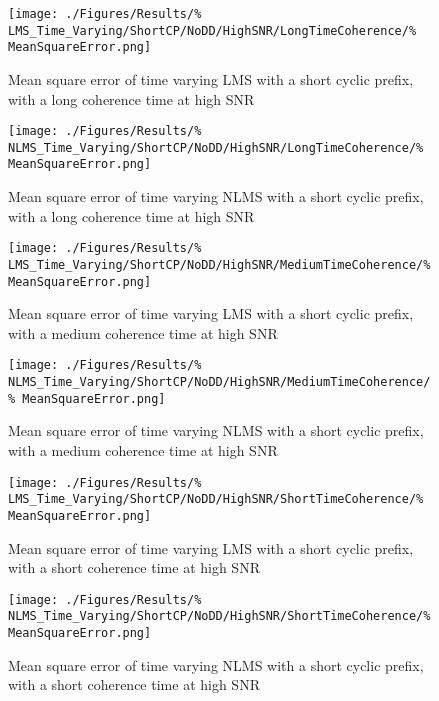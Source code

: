 \begin{figure}[ht]
	\centering
	\begin{minipage}{0.49\textwidth}
		\centering
		\texttt{[image: ./Figures/Results/\%
	LMS\_Time\_Varying/ShortCP/NoDD/HighSNR/LongTimeCoherence/\%
	MeanSquareError.png]}
		\caption{Mean square error of time varying LMS with a 
		short cyclic prefix, with a long coherence time at 
		high SNR}
	\end{minipage}
	\begin{minipage}{0.49\textwidth}
		\centering
		\texttt{[image: ./Figures/Results/\%
	NLMS\_Time\_Varying/ShortCP/NoDD/HighSNR/LongTimeCoherence/\%
	MeanSquareError.png]}
		\caption{Mean square error of time varying NLMS with 
		a short cyclic prefix, with a long coherence time at 
		high SNR}
	\end{minipage}
\end{figure}

\begin{figure}[ht]
	\centering
	\begin{minipage}{0.49\textwidth}
		\centering
		\texttt{[image: ./Figures/Results/\%
	LMS\_Time\_Varying/ShortCP/NoDD/HighSNR/MediumTimeCoherence/\%
	MeanSquareError.png]}
		\caption{Mean square error of time varying LMS with a 
		short cyclic prefix, with a medium coherence time at 
		high SNR}
	\end{minipage}
	\begin{minipage}{0.49\textwidth}
		\centering
		\texttt{[image: ./Figures/Results/\%
	NLMS\_Time\_Varying/ShortCP/NoDD/HighSNR/MediumTimeCoherence/\%
	MeanSquareError.png]}
		\caption{Mean square error of time varying NLMS with 
		a short cyclic prefix, with a medium coherence 
		time at high SNR}
	\end{minipage}
\end{figure}

\begin{figure}[ht]
	\centering
	\begin{minipage}{0.49\textwidth}
		\centering
		\texttt{[image: ./Figures/Results/\%
	LMS\_Time\_Varying/ShortCP/NoDD/HighSNR/ShortTimeCoherence/\%
	MeanSquareError.png]}
		\caption{Mean square error of time varying LMS with a 
		short cyclic prefix, with a short coherence time at 
		high SNR}
	\end{minipage}
	\begin{minipage}{0.49\textwidth}
		\centering
		\texttt{[image: ./Figures/Results/\%
	NLMS\_Time\_Varying/ShortCP/NoDD/HighSNR/ShortTimeCoherence/\%
	MeanSquareError.png]}
		\caption{Mean square error of time varying NLMS with 
		a short cyclic prefix, with a short coherence time 
		at high SNR}
	\end{minipage}
\end{figure}


